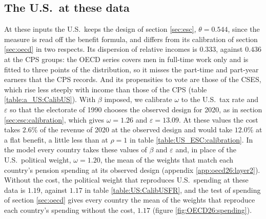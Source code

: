 \subsection{The U.S.\ at these data}\label{app:oecd26:anchor}
At these inputs the U.S.\ keeps the design of section \ref{sec:esc}, $\theta = 0.544$, since the measure is read off the benefit formula, and differs from its calibration of section \ref{sec:oecd} in two respects. Its dispersion of relative incomes is $0.333$, against $0.436$ at the CPS groups: the OECD series covers men in full-time work only and is fitted to three points of the distribution, so it misses the part-time and part-year earners that the CPS records. And its propensities to vote are those of the CSES, which rise less steeply with income than those of the CPS (table \ref{table:a_US:CalibUS}). With $\beta$ imposed, we calibrate $\omega$ to the U.S.\ tax rate and $\varepsilon$ so that the electorate of 1990 chooses the observed design for 2020, as in section \ref{sec:esc:calibration}, which gives $\omega = 1.26$ and $\varepsilon = 13.09$. At these values the cost takes $2.6\%$ of the revenue of 2020 at the observed design and would take $12.0\%$ at a flat benefit, a little less than at $\rho = 1$ in table \ref{table:US_ESC:calibration}. In the model every country takes these values of $\beta$ and $\varepsilon$ and, in place of the U.S.\ political weight, $\omega = 1.20$, the mean of the weights that match each country's pension spending at its observed design (appendix \ref{app:oecd26:layer2}). Without the cost, the political weight that reproduces U.S.\ spending at these data is $1.19$, against $1.17$ in table \ref{table:US:CalibUSFR}, and the test of spending of section \ref{sec:oecd} gives every country the mean of the weights that reproduce each country's spending without the cost, $1.17$ (figure \ref{fig:OECD26:spending}).

